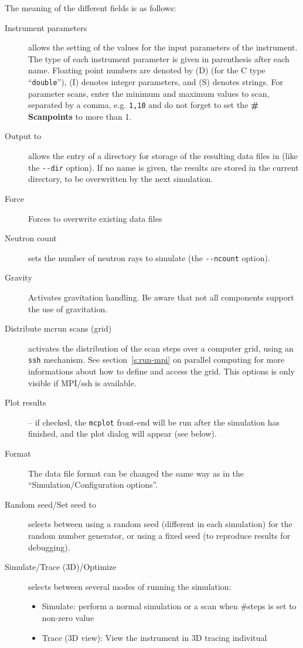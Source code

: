 The meaning of the different fields is as follows:
\begin{description}
\item[Instrument parameters] allows the setting of the values for
  the input parameters of the instrument. The type of each instrument
  parameter is given in parenthesis after each name. Floating point
  numbers are denoted by (D) (for the C type ``\verb+double+''), (I)
  denotes integer parameters, and (S) denotes strings. For parameter scans, enter the minimum and maximum values to scan, separated by a comma, e.g. \verb+1,10+ and do not forget to set the {\bf \# Scanpoints} to more than 1.
\item[Output to] allows the entry of a directory for storage of the
  resulting data files in (like the \verb+--dir+ option). If no name is
  given, the results are stored in the current directory, to be overwritten
  by the next simulation.
\item[Force] Forces to overwrite existing data files
\item[Neutron count] sets the number of neutron rays to
  simulate (the \verb+--ncount+ option).
  \item[Gravity] Activates gravitation handling. Be aware that not all
    components support the use of gravitation.
\item[Distribute mcrun scans (grid)] activates the distribution of the scan
  steps over a computer grid, using an \texttt{ssh} mechanism.
  See section~\ref{s:run-mpi} on parallel computing for more informations
  about how to define and access the grid. This options is only visible if MPI/ssh is available.
\item[Plot results] -- if checked, the \verb+mcplot+ front-end will be run
  after the simulation has finished, and the plot dialog will appear
  (see below).
\item[Format] The data file format can be changed the same way as in the ``Simulation/Configuration options''.
\item[Random seed/Set seed to] selects between using a random seed (different
  in each simulation) for the random number generator, or using a fixed
  seed (to reproduce results for debugging).
\item[Simulate/Trace (3D)/Optimize] selects between several modes of
  running the simulation:
  \begin{itemize}
  \item Simulate: perform a normal simulation or a scan when \#steps
    is set to non-zero value
  \item Trace (3D view): View the instrument in 3D tracing indivitual

\end{itemize}
\end{description}
